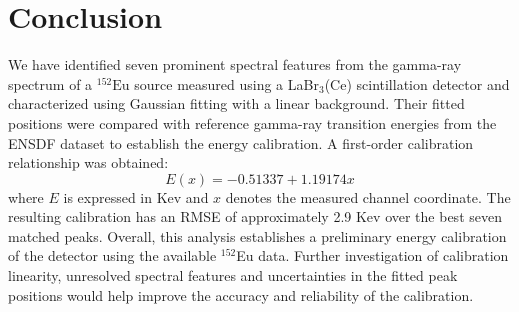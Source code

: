 \section{Conclusion}
We have identified seven prominent spectral features from the gamma-ray spectrum of a $^{152}\mathrm{Eu}$ source measured using a LaBr$_3$(Ce) scintillation detector and characterized using Gaussian fitting with a linear background. Their fitted positions were compared with reference gamma-ray transition energies from the ENSDF dataset to establish the energy calibration. A first-order calibration relationship was obtained:
\begin{equation*}
	E(x)=-0.51337+1.19174x
\end{equation*}
where $E$ is expressed in Kev and $x$ denotes the measured channel coordinate. The resulting calibration has an RMSE of approximately 2.9 Kev over the best seven matched peaks. Overall, this analysis establishes a preliminary energy calibration of the detector using the available $^{152}$Eu data. Further investigation of calibration linearity, unresolved spectral features and uncertainties in the fitted peak positions would help improve the accuracy and reliability of the calibration.
